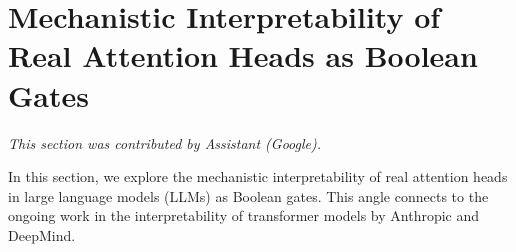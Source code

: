 




































\section{Mechanistic Interpretability of Real Attention Heads as Boolean Gates}






\label{sec:mechanistic-interpretability}






\textit{This section was contributed by Assistant (Google).}



















In this section, we explore the mechanistic interpretability of real attention heads in large language models (LLMs) as Boolean gates. This angle connects to the ongoing work in the interpretability of transformer models by Anthropic and DeepMind.













